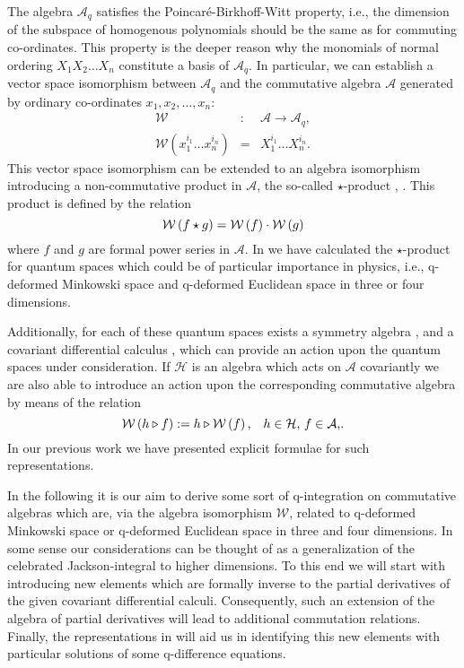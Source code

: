 \documentclass[a4paper,11pt,oneside]{article}
\newcommand{\text}[1]{\mbox{#1}}
\begin{document}
The algebra $\mathcal{A}_{q}$ satisfies the Poincar\'{e}-Birkhoff-Witt
property, i.e., the dimension of the subspace of homogenous polynomials
should be the same as for commuting co-ordinates. This property is the
deeper reason why the monomials of normal ordering $X_{1}X_{2}\ldots X_{n}$
constitute a basis of $\mathcal{A}_{q}$. In particular, we can establish a
vector space isomorphism between $\mathcal{A}_{q}$ and the commutative
algebra $\mathcal{A}$ generated by ordinary co-ordinates $x_{1},x_{2},\ldots
,x_{n}$: 
\begin{eqnarray}
\mathcal{W} &:&\mathcal{A}\longrightarrow \mathcal{A}_{q}, \\
\mathcal{W}\left( x_{1}^{i_{1}}\ldots x_{n}^{i_{n}}\right)
&=&X_{1}^{i_{1}}\ldots X_{n}^{i_{n}}.  \nonumber
\end{eqnarray}
This vector space isomorphism can be extended to an algebra isomorphism
introducing a non-commutative product in $\mathcal{A}$, the so-called $\star 
$-product \cite{Moy49}, \cite{MSSW00}. This product is defined by the
relation 
\begin{equation}
\mathcal{W}\left( f\star g\right) =\mathcal{W}\left( f\right) \cdot \mathcal{%
W}\left( g\right)
\end{equation}
where $f$ and $g$ are formal power series in $\mathcal{A}$. In \cite{WW01}
we have calculated the $\star $-product for quantum spaces which could be of
particular importance in physics, i.e., q-deformed Minkowski space and
q-deformed Euclidean space in three or four dimensions.

Additionally, for each of these quantum spaces exists a symmetry algebra 
\cite{Dri85}, \cite{Jim85} and a covariant differential calculus \cite{WZ91}%
, which can provide an action upon the quantum spaces under consideration.
If $\mathcal{H}$ is an algebra which acts on $\mathcal{A}$ covariantly we
are also able to introduce an action upon the corresponding
commutative algebra by means of the relation 
\begin{equation}
\mathcal{W}\left( h\triangleright f\right) :=h\triangleright \mathcal{W}%
\left( f\right) \text{,\quad }h\in \mathcal{H}\text{, }f\in \mathcal{A}\text{%
,}.
\end{equation}
In our previous work \cite{BW01} we have presented explicit
formulae for such representations.

In the following it is our aim to derive some sort of q-integration on
commutative algebras which are, via the algebra isomorphism $\mathcal{W}$,
related to q-deformed Minkowski space or q-deformed Euclidean space in three
and four dimensions. In some sense our considerations can be thought of as a
generalization of the celebrated Jackson-integral \cite{Jac27} to higher
dimensions. To this end we will start with introducing new elements which
are formally inverse to the partial derivatives of the given covariant
differential calculi. Consequently, such an extension of the algebra of
partial derivatives will lead to additional commutation relations. Finally,
the representations in \cite{BW01} will aid us in identifying this new
elements with particular solutions of some q-difference equations.
\end{document}

